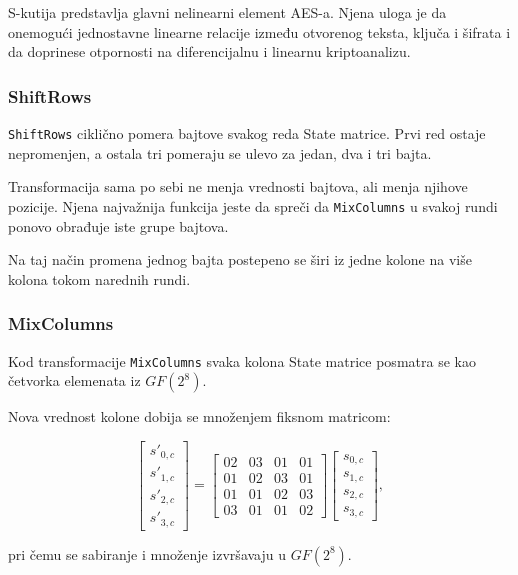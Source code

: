 S-kutija predstavlja glavni nelinearni element AES-a. Njena uloga je
da onemogući jednostavne linearne relacije između otvorenog teksta,
ključa i šifrata i da doprinese otpornosti na diferencijalnu i linearnu
kriptoanalizu.


\subsubsection{ShiftRows}

\texttt{ShiftRows} ciklično pomera bajtove svakog reda State matrice.
Prvi red ostaje nepromenjen, a ostala tri pomeraju se ulevo za jedan,
dva i tri bajta.

Transformacija sama po sebi ne menja vrednosti bajtova, ali menja
njihove pozicije. Njena najvažnija funkcija jeste da spreči da
\texttt{MixColumns} u svakoj rundi ponovo obrađuje iste grupe bajtova.

Na taj način promena jednog bajta postepeno se širi iz jedne kolone na
više kolona tokom narednih rundi.


\subsubsection{MixColumns}

Kod transformacije \texttt{MixColumns} svaka kolona State matrice
posmatra se kao četvorka elemenata iz $GF(2^8)$.

Nova vrednost kolone dobija se množenjem fiksnom matricom:

\begin{equation}
\begin{bmatrix}
s'_{0,c}\\
s'_{1,c}\\
s'_{2,c}\\
s'_{3,c}
\end{bmatrix}
=
\begin{bmatrix}
02 & 03 & 01 & 01\\
01 & 02 & 03 & 01\\
01 & 01 & 02 & 03\\
03 & 01 & 01 & 02
\end{bmatrix}
\begin{bmatrix}
s_{0,c}\\
s_{1,c}\\
s_{2,c}\\
s_{3,c}
\end{bmatrix},
\label{eq:aes-mixcolumns}
\end{equation}

pri čemu se sabiranje i množenje izvršavaju u $GF(2^8)$.

